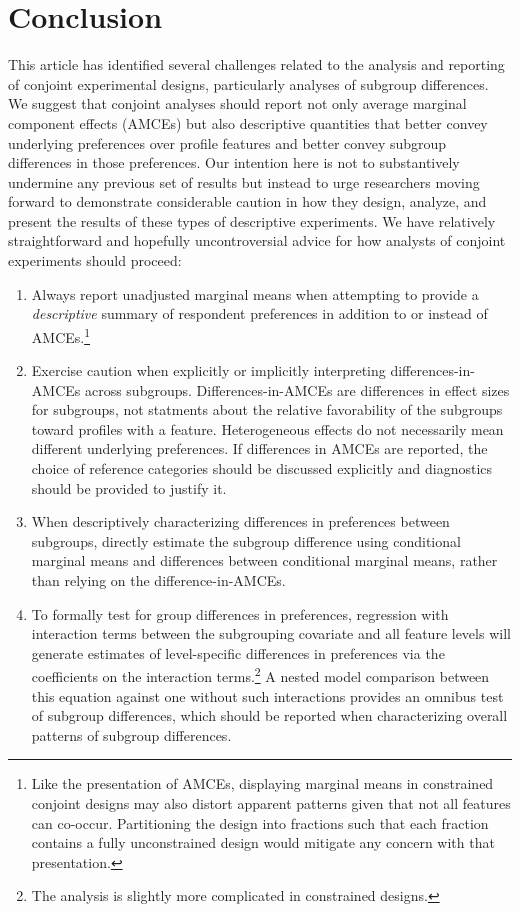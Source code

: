 \documentclass[a4paper,12pt]{article}\usepackage[]{graphicx}\usepackage[]{color}
\begin{document}
\section*{Conclusion}\label{sec:conclusion}

This article has identified several challenges related to the analysis and reporting of conjoint experimental designs, particularly analyses of subgroup differences. We suggest that conjoint analyses should report not only average marginal component effects (AMCEs) but also descriptive quantities that better convey underlying preferences over profile features and better convey subgroup differences in those preferences. Our intention here is not to substantively undermine any previous set of results but instead to urge researchers moving forward to demonstrate considerable caution in how they design, analyze, and present the results of these types of descriptive experiments. We have relatively straightforward and hopefully uncontroversial advice for how analysts of conjoint experiments should proceed:

\begin{enumerate}
\item Always report unadjusted marginal means when attempting to provide a \textit{descriptive} summary of respondent preferences in addition to or instead of AMCEs.\footnote{Like the presentation of AMCEs, displaying marginal means in constrained conjoint designs may also distort apparent patterns given that not all features can co-occur. Partitioning the design into fractions such that each fraction contains a fully unconstrained design would mitigate any concern with that presentation.}

\item Exercise caution when explicitly or implicitly interpreting differences-in-AMCEs across subgroups. Differences-in-AMCEs are differences in effect sizes for subgroups, not statments about the relative favorability of the subgroups toward profiles with a feature. Heterogeneous effects do not necessarily mean different underlying preferences. If differences in AMCEs are reported, the choice of reference categories should be discussed explicitly and diagnostics should be provided to justify it.

\item When descriptively characterizing differences in preferences between subgroups, directly estimate the subgroup difference using conditional marginal means and differences between conditional marginal means, rather than relying on the difference-in-AMCEs.

\item To formally test for group differences in preferences, regression with interaction terms between the subgrouping covariate and all feature levels will generate estimates of level-specific differences in preferences via the coefficients on the interaction terms.\footnote{The analysis is slightly more complicated in constrained designs.} A nested model comparison between this equation against one without such interactions provides an omnibus test of subgroup differences, which should be reported when characterizing overall patterns of subgroup differences.
\end{enumerate}
\end{document}
